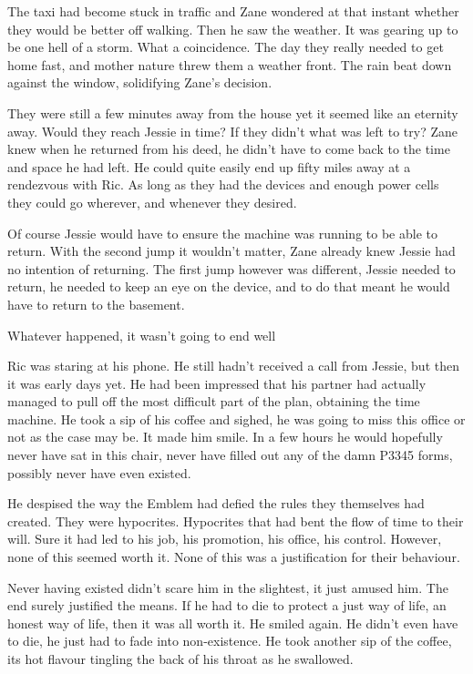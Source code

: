 The taxi had become stuck in traffic and Zane wondered at that instant whether they would be better off walking.  Then he saw the weather.  It was gearing up to be one hell of a storm.  What a coincidence.  The day they really needed to get home fast, and mother nature threw them a weather front.  The rain beat down against the window, solidifying Zane's decision.

They were still a few minutes away from the house yet it seemed like an eternity away.  Would they reach Jessie in time?  If they didn't what was left to try?  Zane knew when he returned from his deed, he didn't have to come back to the time and space he had left.  He could quite easily end up fifty miles away at a rendezvous with Ric.  As long as they had the devices and enough power cells they could go wherever, and whenever they desired.  

Of course Jessie would have to ensure the machine was running to be able to return.  With the second jump it wouldn't matter, Zane already knew Jessie had no intention of returning.  The first jump however was different, Jessie needed to return, he needed to keep an eye on the device, and to do that meant he would have to return to the basement.  

Whatever happened, it wasn't going to end well



\thoughtbreak



Ric was staring at his phone.  He still hadn't received a call from Jessie, but then it was early days yet.  He had been impressed that his partner had actually managed to pull off the most difficult part of the plan, obtaining the time machine.  He took a sip of his coffee and sighed, he was going to miss this office or not as the case may be.  It made him smile.  In a few hours he would hopefully never have sat in this chair, never have filled out any of the damn P3345 forms, possibly never have even existed.

He despised the way the Emblem had defied the rules they themselves had created.  They were hypocrites.  Hypocrites that had bent the flow of time to their will.  Sure it had led to his job, his promotion, his office, his control.  However, none of this seemed worth it.  None of this was a justification for their behaviour.

Never having existed didn't scare him in the slightest, it just amused him.  The end surely justified the means.  If he had to die to protect a just way of life, an honest way of life, then it was all worth it.  He smiled again.  He didn't even have to die, he just had to fade into non-existence.  He took another sip of the coffee, its hot flavour tingling the back of his throat as he swallowed.  

